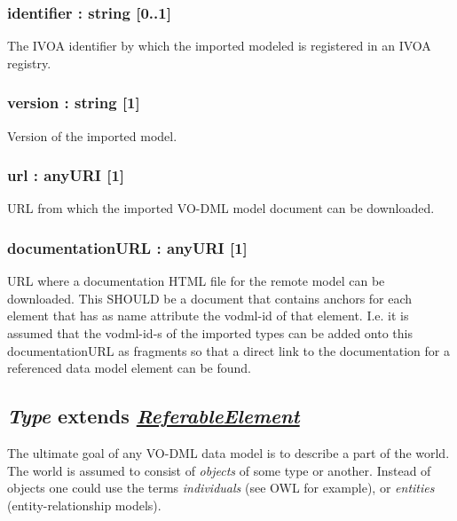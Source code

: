 \documentclass[10pt,a4paper]{ivoa}
\begin{document}
\hypertarget{identifier-string-0..1}{%
\subsubsection{identifier : string
{[}0..1{]}}\label{identifier-string-0..1}}

The IVOA identifier by which the imported modeled is registered in an
IVOA registry.

\hypertarget{version-string-1-1}{%
\subsubsection{version : string {[}1{]}}\label{version-string-1-1}}

Version of the imported model.

\hypertarget{url-anyuri-1}{%
\subsubsection{url : anyURI {[}1{]}}\label{url-anyuri-1}}

URL from which the imported VO-DML model document can be downloaded.

\hypertarget{documentationurl-anyuri-1}{%
\subsubsection{documentationURL : anyURI
{[}1{]}}\label{documentationurl-anyuri-1}}

URL where a documentation HTML file for the remote model can be
downloaded. This SHOULD be a document that contains anchors for each
element that has as name attribute the vodml-id of that element. I.e. it
is assumed that the vodml-id-s of the imported types can be added onto
this documentationURL as fragments so that a direct link to the
documentation for a referenced data model element can be found.

\hypertarget{type-extends-referableelement}{%
\subsection{\texorpdfstring{\emph{Type} extends
\protect\hyperlink{type-extends-referableelement}{\emph{ReferableElement}}}{Type extends ReferableElement}}\label{type-extends-referableelement}}

The ultimate goal of any VO-DML data model is to describe a part of the
world. The world is assumed to consist of \emph{objects} of some type or
another. Instead of objects one could use the terms \emph{individuals}
(see OWL for example), or \emph{entities} (entity-relationship models).
\end{document}
